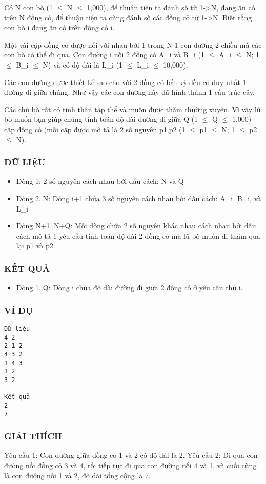 



   Có N con bò (1  $\le$  N  $\le$  1,000), để thuận tiện ta đánh số từ 1->N, đang ăn cỏ trên N đồng cỏ, để thuận tiện ta cũng đánh số các đồng cỏ từ 1->N. Biết rằng con bò i đang ăn cỏ trên đồng cỏ i.  

   Một vài cặp đồng cỏ được nối với nhau bởi 1 trong N-1 con đường 2 chiều mà các con bò có thể đi qua. Con đường i nối 2 đồng cỏ A\_i và B\_i (1  $\le$  A\_i  $\le$  N; 1  $\le$  B\_i  $\le$  N) và có độ dài là L\_i (1  $\le$  L\_i  $\le$  10,000).  

   Các con đường được thiết kế sao cho với 2 đồng cỏ bất kỳ đều có duy nhất 1 đường đi giữa chúng. Như vậy các con đường này đã hình thành 1 cấu trúc cây.  

   Các chú bò rất có tinh thần tập thể và muốn được thăm thường xuyên. Vì vậy lũ bò muốn bạn giúp chúng tính toán độ dài đường đi giữa Q (1  $\le$  Q  $\le$  1,000) cặp đồng cỏ (mỗi cặp được mô tả là 2 số nguyên p1,p2 (1  $\le$  p1  $\le$  N; 1  $\le$  p2  $\le$  N).  

\subsubsection{   DỮ LIỆU  }
\begin{itemize}
	\item     Dòng 1: 2 số nguyên cách nhau bởi dấu cách: N và Q   
	\item     Dòng 2..N: Dòng i+1 chứa 3 số nguyên cách nhau bởi dấu cách: A\_i,         B\_i, và L\_i   
	\item     Dòng N+1..N+Q: Mỗi dòng chứa 2 số nguyên khác nhau cách nhau bởi dấu cách         mô tả 1 yêu cầu tính toán độ dài 2 đồng cỏ mà lũ bò muốn đi thăm qua lại p1 và p2.   
\end{itemize}

\subsubsection{   KẾT QUẢ  }
\begin{itemize}
	\item     Dòng 1..Q: Dòng i chứa độ dài đường đi giữa 2 đồng cỏ         ở yêu cầu thứ i.   
\end{itemize}

\subsubsection{   VÍ DỤ  }
\begin{verbatim}
Dữ liệu
4 2
2 1 2
4 3 2
1 4 3
1 2
3 2

Kết quả
2
7
\end{verbatim}

\subsubsection{   GIẢI THÍCH  }

   Yêu cầu 1: Con đường giữa đồng cỏ 1 và 2 có độ dài là 2. Yêu cầu 2: Đi qua con đường nối đồng cỏ 3 và 4, rồi tiếp tục đi qua con đường nối 4 và 1, và cuối cùng là con đướng nối 1 và 2, độ dài tổng cộng là 7.  
